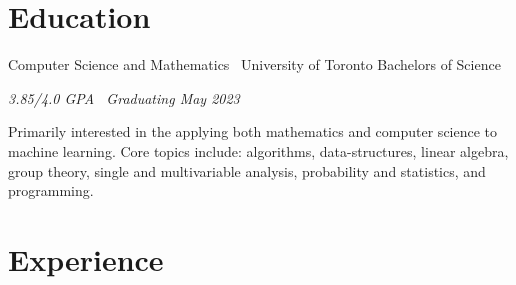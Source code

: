 \documentclass[]{style}
\begin{document}
\section{Education}

\begin{entrylist}


\entry
{Computer Science and Mathematics \ {\normalfont University of Toronto}}
{Bachelors of Science}
{\emph{3.85/4.0 GPA \ Graduating May 2023}
~ \vspace{1mm}

Primarily interested in the applying both mathematics and computer science to machine learning. Core topics include: algorithms, data-structures, linear algebra, group theory, single and multivariable analysis, probability and statistics, and programming.}


\end{entrylist}


\section{Experience}
\end{document}
